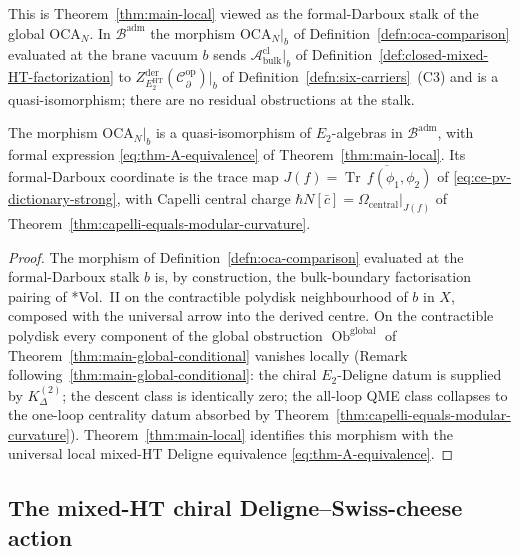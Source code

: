\begin{thm}
\label{thm:oca-formal-darboux-fibre}

This is Theorem~\ref{thm:main-local} viewed as the formal-Darboux
stalk of the global $\mathrm{OCA}_N$.  In $\mathcal B^{\mathrm{adm}}$
the morphism $\mathrm{OCA}_N|_b$ of
Definition~\ref{defn:oca-comparison} evaluated at the brane vacuum
$b$ sends $\mathcal A^{\mathrm{cl}}_{\mathrm{bulk}}\big|_b$ of
Definition~\ref{def:closed-mixed-HT-factorization} to
$Z^{\mathrm{der}}_{E_2^{\mathrm{HT}}}(\mathcal C^{\mathrm{op}}_\partial)\big|_b$
of Definition~\ref{defn:six-carriers}~(C3) and is a quasi-isomorphism;
there are no residual obstructions at the stalk.

The morphism \(\mathrm{OCA}_N|_b\) is a quasi-isomorphism of
\(E_2\)-algebras in \(\mathcal B^{\mathrm{adm}}\), with formal
expression \eqref{eq:thm-A-equivalence} of
Theorem~\ref{thm:main-local}.  Its formal-Darboux coordinate is the
trace map
\(J(f)=\overline{\operatorname{Tr}\,f(\phi_1,\phi_2)}\) of
\eqref{eq:ce-pv-dictionary-strong}, with Capelli central charge
\(\hbar N[\bar c]=\Omega_{\mathrm{central}}|_{J(f)}\) of
Theorem~\ref{thm:capelli-equals-modular-curvature}.
\end{thm}

\begin{proof}
The morphism of Definition~\ref{defn:oca-comparison} evaluated at the
formal-Darboux stalk \(b\) is, by construction, the bulk-boundary
factorisation pairing of \cite{costello-gwilliam}*{Vol.~II} on the
contractible polydisk neighbourhood of \(b\) in \(X\), composed with
the universal arrow into the derived centre.  On the contractible
polydisk every component of the global obstruction
\(\operatorname{Ob}^{\mathrm{global}}\) of
Theorem~\ref{thm:main-global-conditional} vanishes locally
(Remark following~\ref{thm:main-global-conditional}: the chiral
\(E_2\)-Deligne datum is supplied by \(K^{(2)}_\Delta\); the descent
class is identically zero; the all-loop QME class collapses to the
one-loop centrality datum absorbed by
Theorem~\ref{thm:capelli-equals-modular-curvature}).  Theorem~\ref{thm:main-local}
identifies this morphism with the universal local mixed-HT Deligne
equivalence \eqref{eq:thm-A-equivalence}.
\end{proof}

\subsection{The mixed-HT chiral Deligne--Swiss-cheese action}
\label{ssec:sc-ht-deligne}

